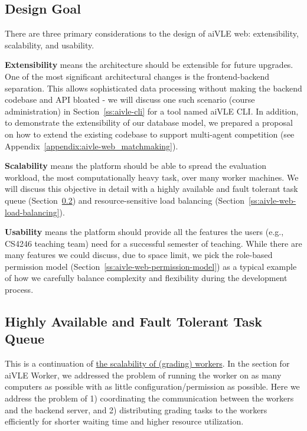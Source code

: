 \subsection{Design Goal}
There are three primary considerations to the design of aiVLE web: extensibility, scalability, and usability. 

\textbf{Extensibility} means the architecture should be extensible for future upgrades. One of the most significant architectural changes is the frontend-backend separation. This allows sophisticated data processing without making the backend codebase and API bloated - we will discuss one such scenario (course administration) in Section~\ref{ss:aivle-cli} for a tool named aiVLE CLI. In addition, to demonstrate the extensibility of our database model, we prepared a proposal on how to extend the existing codebase to support multi-agent competition (see Appendix~\ref{appendix:aivle-web_matchmaking}).

\textbf{Scalability} means the platform should be able to spread the evaluation workload, the most computationally heavy task, over many worker machines. We will discuss this objective in detail with a highly available and fault tolerant task queue (Section~\ref{ch:aivle-web_highly-available-task-queue}) and resource-sensitive load balancing (Section~\ref{ss:aivle-web-load-balancing}).

\textbf{Usability} means the platform should provide all the features the users (e.g., CS4246 teaching team) need for a successful semester of teaching. While there are many features we could discuss, due to space limit, we pick the role-based permission model (Section~\ref{ss:aivle-web-permission-model}) as a typical example of how we carefully balance complexity and flexibility during the development process.

\subsection{Highly Available and Fault Tolerant Task Queue}
\label{ch:aivle-web_highly-available-task-queue}
This is a continuation of \hyperref[ss:aivle-worker-design-goal]{the scalability of (grading) workers}. In the section for aiVLE Worker, we addressed the problem of running the worker on as many computers as possible with as little configuration/permission as possible. Here we address the problem of 1) coordinating the communication between the workers and the backend server, and 2) distributing grading tasks to the workers efficiently for shorter waiting time and higher resource utilization.
